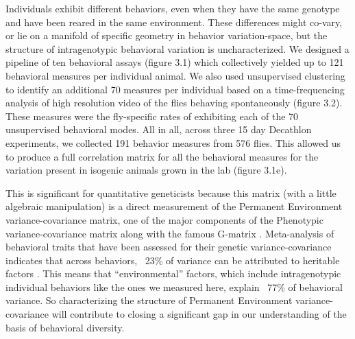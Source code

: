 \documentclass[12pt,letterpaper]{article}
\begin{document}
Individuals exhibit different behaviors, even when they have the same genotype and have been reared in the same environment. These differences might co-vary, or lie on a manifold of specific geometry in behavior variation-space, but the structure of intragenotypic behavioral variation is uncharacterized. We designed a pipeline of ten behavioral assays (figure 3.1) which collectively yielded up to 121 behavioral measures per individual animal. We also used unsupervised clustering to identify an additional 70 measures per individual based on a time-frequencing analysis of high resolution video of the flies behaving spontaneously (figure 3.2). These measures were the fly-specific rates of exhibiting each of the 70 unsupervised behavioral modes. All in all, across three 15 day Decathlon experiments, we collected 191 behavior measures from 576 flies. This allowed us to produce a full correlation matrix for all the behavioral measures for the variation present in isogenic animals grown in the lab (figure 3.1e). 

This is significant for quantitative geneticists because this matrix (with a little algebraic manipulation) is a direct measurement of the Permanent Environment variance-covariance matrix, one of the major components of the Phenotypic variance-covariance matrix along with the famous G-matrix \cite{Charmantier_Quantitative_2014}. Meta-analysis of behavioral traits that have been assessed for their genetic variance-covariance indicates that across behaviors, ~23\% of variance can be attributed to heritable factors \cite{Dochtermann_The_2019}. This means that “environmental” factors, which include intragenotypic individual behaviors like the ones we measured here, explain ~77\% of behavioral variance. So characterizing the structure of Permanent Environment variance-covariance will contribute to closing a significant gap in our understanding of the basis of behavioral diversity.
\end{document}
